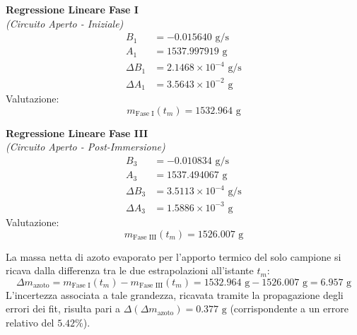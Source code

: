\documentclass[a4paper,12pt]{article}
\begin{document}
\vspace{0.2cm}
\noindent
\begin{minipage}[t]{0.48\textwidth}
    \centering
    \textbf{Regressione Lineare Fase I} \\
    \textit{(Circuito Aperto - Iniziale)}
    \begin{align*}
        B_1 &= -0.015640 \text{ g/s} \\
        A_1 &= 1537.997919 \text{ g} \\
        \Delta B_1 &= 2.1468 \times 10^{-4} \text{ g/s} \\
        \Delta A_1 &= 3.5643 \times 10^{-2} \text{ g}
    \end{align*}
    Valutazione:
    \begin{equation*}
        m_{\text{Fase I}}(t_m) = 1532.964\text{ g}
    \end{equation*}
\end{minipage}
\hfill
\begin{minipage}[t]{0.48\textwidth}
    \centering
    \textbf{Regressione Lineare Fase III} \\
    \textit{(Circuito Aperto - Post-Immersione)}
    \begin{align*}
        B_3 &= -0.010834 \text{ g/s} \\
        A_3 &= 1537.494067 \text{ g} \\
        \Delta B_3 &= 3.5113 \times 10^{-4} \text{ g/s} \\
        \Delta A_3 &= 1.5886 \times 10^{-3} \text{ g}
    \end{align*}
    Valutazione:
    \begin{equation*}
        m_{\text{Fase III}}(t_m) = 1526.007\text{ g}
    \end{equation*}
\end{minipage}
\vspace{0.4cm}
\noindent

La massa netta di azoto evaporato per l'apporto termico del solo campione si ricava dalla differenza tra le due estrapolazioni all'istante $t_m$:
\begin{equation*}
    \Delta m_{\text{azoto}} = m_{\text{Fase I}}(t_m) - m_{\text{Fase III}}(t_m) = 1532.964\text{ g} - 1526.007\text{ g} = 6.957\text{ g}
\end{equation*}
L'incertezza associata a tale grandezza, ricavata tramite la propagazione degli errori dei fit, risulta pari a $\Delta(\Delta m_{\text{azoto}}) = 0.377\text{ g}$ (corrispondente a un errore relativo del $5.42\%$).
\end{document}
